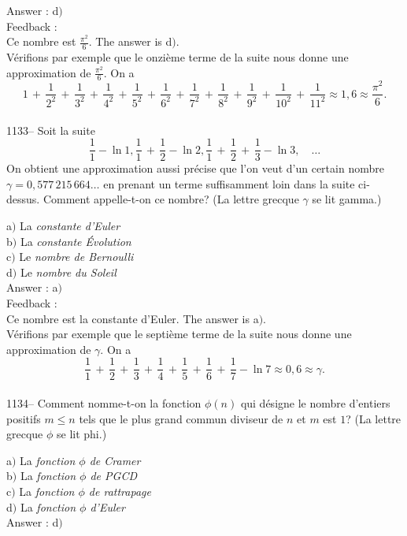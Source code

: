 \documentclass[letterpaper, 12pt]{article}
\begin{document}
Answer : d$)$\\

Feedback : \\
Ce nombre est $\frac{\pi^2}6$. The answer is d$)$.\\
V\'erifions
par exemple que le onzi\`eme terme de la suite nous donne une
approximation de $\frac{\pi^2}6$. On a
$$\displaystyle{1\,+\,\frac1{2^2}\,+\,\frac1{3^2}\,+\,\frac1{4^2}\,+\,\frac1{5^2}\,+\,\frac1{6^2}\,+\,\frac1{7^2}
\,+\,\frac1{8^2}\,+\,\frac1{9^2}\,+\,\frac1{10^2}\,+\,\frac1{11^2}\approx1,6\approx\frac{\pi^2}6}.$$\\

1133-- Soit la suite
$$\displaystyle{\frac11-\ln1,\frac11\,+\,\frac12-\ln2,\frac11\,+\,\frac12\,+\,\frac13-\ln3},\quad\ldots$$
On obtient une approximation aussi pr\'ecise que l'on veut d'un
certain nombre $\gamma=0,577\,215\,664\ldots$ en prenant un terme
suffisamment loin dans la suite ci-dessus. Comment appelle-t-on ce
nombre? (La lettre grecque $\gamma$ se lit gamma.)

a$)$ La {\sl constante d'Euler}\\
b$)$ La {\sl constante \'Evolution} \\
c$)$ Le {\sl nombre de Bernoulli} \\
d$)$ Le {\sl nombre du Soleil}\\

Answer : a$)$\\

Feedback : \\
Ce nombre est la constante d'Euler. The answer is
a$)$.\\
V\'erifions par exemple que le septi\`eme terme de la suite
nous donne une approximation de $\gamma$. On a
$$\displaystyle{\frac11\,+\,\frac12\,+\,\frac13\,+\,\frac14\,+\,\frac15\,+\,\frac16\,+\,\frac17-\ln7}
\approx0,6\approx\gamma.$$\\

1134-- Comment nomme-t-on la fonction $\phi(n)$ qui d\'esigne le
nombre d'entiers positifs $m\le n$ tels que le plus grand commun
diviseur de $n$ et $m$ est $1$? (La lettre grecque $\phi$ se lit
phi.)

a$)$ La {\sl fonction $\phi$ de Cramer} \\
b$)$ La {\sl fonction $\phi$ de PGCD}   \\
c$)$ La {\sl fonction $\phi$ de rattrapage} \\
d$)$ La {\sl fonction $\phi$ d'Euler}\\

Answer : d$)$\\
\end{document}
